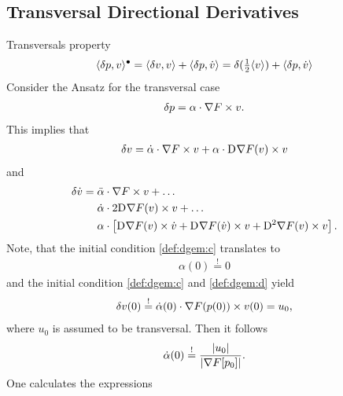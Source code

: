 \subsection{Transversal Directional Derivatives}


Transversals property
\begin{align}
    \langle  \delta p ,  v  \rangle^\bullet  =
    \langle  \delta v ,  v  \rangle  +  \langle  \delta p ,  \dot{ v }  \rangle  =
    \delta( \tfrac12 \langle  v  \rangle )  +  \langle  \delta p ,  \dot{ v }  \rangle
\end{align}
Consider the Ansatz for the transversal case
\begin{align}
    \delta p  =  \alpha \cdot \nabla F  \times v .
    \label{def:ta}
\end{align}
This implies that
\begin{align}
    \delta v  =
    \dot{ \alpha } \cdot \nabla F  \times v  +
    \alpha \cdot \mathrm{D}^{  } \nabla F  ( v ) \times v
    \label{eq:tad}
\end{align}
and
\begin{align}
    \delta \dot{ v }  &=
    \ddot{ \alpha } \mult \grad{ F } \times v  +  \dots\nonumber\\
    &\hphantom{{}={}}\dot{ \alpha } \mult 2 \diff{}{ \grad{ F } }( v ) \times v  +  \dots\nonumber\\
    &\hphantom{{}={}}\alpha \mult \left[ \diff{}{ \grad{ F } }( v ) \times \dot{ v }  +
    \diff{}{ \grad{ F } }( \dot{ v } ) \times v  +  
    \diff{ 2 }{ \grad{ F } }( v ) \times v \right] .
    \label{eq:tadd}
\end{align}
Note, that the initial condition \eqref{def:dgem:c} translates to
\begin{align}
    \alpha( 0 )  \overset{!}{=}  0
\end{align}
and the initial condition \eqref{def:dgem:c} and \eqref{def:dgem:d} yield
\begin{align}
    \delta v( 0 )   \overset{!}{=}
    \dot{ \alpha }( 0 ) \cdot \nabla F( p( 0 ) ) \times v( 0 )  =  u_0 ,
\end{align}
where $ u_0 $ is assumed to be transversal.
Then it follows 
\begin{align}
    \dot{ \alpha }( 0 )   \overset{!}{=}
    \frac{ \lvert  u_0  \rvert }{ \lvert  \nabla F[ p_0 ]  \rvert } .
\end{align}
One calculates the expressions
